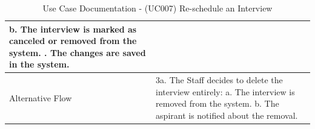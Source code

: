 \documentclass{scrreprt}
\begin{document}
\begin{table}[H]
\begin{tabular}{|p{3cm}|p{10cm}|}
		\hspace*{0.5cm} b. The interview is marked as canceled or removed from the system. \newline
		6. The changes are saved in the system. \\ \hline
		Alternative Flow & 
		3a. The Staff decides to delete the interview entirely: \newline
		\hspace*{0.5cm} a. The interview is removed from the system. \newline
		\hspace*{0.5cm} b. The aspirant is notified about the removal. \\ \hline
	\end{tabular}
	\caption{Use Case Documentation - (UC007) Re-schedule an Interview}
	\label{table:UC007}
\end{table}
\end{document}
